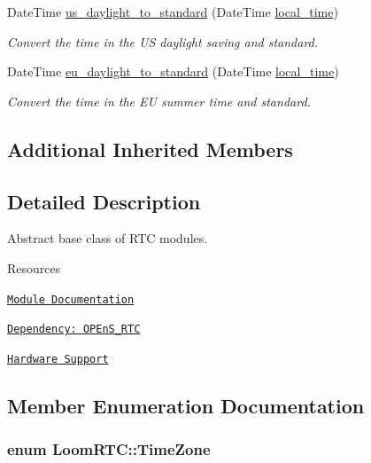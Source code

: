 \begin{DoxyCompactItemize}
Date\+Time \hyperlink{class_loom_r_t_c_ab78edb38537fd80c4fbd1ac1625606b5}{us\+\_\+daylight\+\_\+to\+\_\+standard} (Date\+Time \hyperlink{class_loom_r_t_c_ab3d490dd52a5e2d2413d1f0c00944a7b}{local\+\_\+time})
\begin{DoxyCompactList}\small\item\em Convert the time in the US daylight saving and standard. \end{DoxyCompactList}\item 
Date\+Time \hyperlink{class_loom_r_t_c_a6bde5d91ff867799abc3f635614d0a4e}{eu\+\_\+daylight\+\_\+to\+\_\+standard} (Date\+Time \hyperlink{class_loom_r_t_c_ab3d490dd52a5e2d2413d1f0c00944a7b}{local\+\_\+time})
\begin{DoxyCompactList}\small\item\em Convert the time in the EU summer time and standard. \end{DoxyCompactList}\end{DoxyCompactItemize}
\subsection*{Additional Inherited Members}


\subsection{Detailed Description}
Abstract base class of R\+TC modules. 

\begin{DoxyParagraph}{Resources}

\begin{DoxyItemize}
\item \href{https://openslab-osu.github.io/Loom/html/class_loom_r_t_c.html}{\tt Module Documentation}
\item \href{https://github.com/OPEnSLab-OSU/OPEnS_RTC}{\tt Dependency\+: O\+P\+En\+S\+\_\+\+R\+TC}
\item \href{https://github.com/OPEnSLab-OSU/Loom/wiki/Hardware-Support#data-logging}{\tt Hardware Support} 
\end{DoxyItemize}
\end{DoxyParagraph}


\subsection{Member Enumeration Documentation}
\subsubsection[{\texorpdfstring{Time\+Zone}{TimeZone}}]{\setlength{\rightskip}{0pt plus 5cm}enum {\bf Loom\+R\+T\+C\+::\+Time\+Zone}\hspace{0.3cm}{\ttfamily [strong]}}\hypertarget{class_loom_r_t_c_a103a9db94b031555185bbce688d2527a}{}\label{class_loom_r_t_c_a103a9db94b031555185bbce688d2527a}


